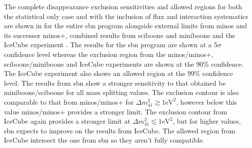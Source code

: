 The complete \numu disappearance exclusion sensitivities and allowed regions for both the statistical only case and with the inclusion of flux and interaction systematics are shown in  for the entire \gls{sbn} program alongside external limits from \gls{minos} and its successor \gls{minos}+, combined results from \gls{sciboone} and \gls{miniboone} and the IceCube experiment \cite{MINOS+} \cite{MiniBooNE/SciBooNE_numu_disapp_contour} \cite{IceCube_numu_disapp_contour}. The results for the \gls{sbn} program are shown at a 5$\sigma$ confidence level whereas the exclusion region from the \gls{minos}/\gls{minos}+, \gls{sciboone}/\gls{miniboone} and IceCube experiments are shown at the 90\% confidence. The IceCube experiment also shows an allowed region at the 99\% confidence level. The results from \gls{sbn} show a stronger sensitivity to that obtained be \gls{miniboone}/\gls{sciboone} for all mass splitting values. The exclusion contour is also comparable to that from \gls{minos}/\gls{minos}+ for $\Delta m^2_{41} \gtrsim 1\text{eV}^2$, however below this value \gls{minos}/\gls{minos}+ provides a stronger limit. The exclusion contour from IceCube again provides a stronger limit at $\Delta m^2_{41} \lesssim 1\text{eV}^2$, but for higher values, \gls{sbn} expects to improve on the results from IceCube. The allowed region from IceCube intersect the one from \gls{sbn} so they aren't fully compatible. 

